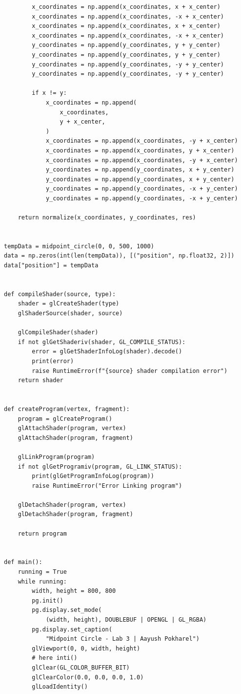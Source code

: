 \documentclass[12pt]{article}
\begin{document}
\begin{verbatim}
        x_coordinates = np.append(x_coordinates, x + x_center)
        x_coordinates = np.append(x_coordinates, -x + x_center)
        x_coordinates = np.append(x_coordinates, x + x_center)
        x_coordinates = np.append(x_coordinates, -x + x_center)
        y_coordinates = np.append(y_coordinates, y + y_center)
        y_coordinates = np.append(y_coordinates, y + y_center)
        y_coordinates = np.append(y_coordinates, -y + y_center)
        y_coordinates = np.append(y_coordinates, -y + y_center)

        if x != y:
            x_coordinates = np.append(
                x_coordinates,
                y + x_center,
            )
            x_coordinates = np.append(x_coordinates, -y + x_center)
            x_coordinates = np.append(x_coordinates, y + x_center)
            x_coordinates = np.append(x_coordinates, -y + x_center)
            y_coordinates = np.append(y_coordinates, x + y_center)
            y_coordinates = np.append(y_coordinates, x + y_center)
            y_coordinates = np.append(y_coordinates, -x + y_center)
            y_coordinates = np.append(y_coordinates, -x + y_center)

    return normalize(x_coordinates, y_coordinates, res)


tempData = midpoint_circle(0, 0, 500, 1000)
data = np.zeros(int(len(tempData)), [("position", np.float32, 2)])
data["position"] = tempData


def compileShader(source, type):
    shader = glCreateShader(type)
    glShaderSource(shader, source)

    glCompileShader(shader)
    if not glGetShaderiv(shader, GL_COMPILE_STATUS):
        error = glGetShaderInfoLog(shader).decode()
        print(error)
        raise RuntimeError(f"{source} shader compilation error")
    return shader


def createProgram(vertex, fragment):
    program = glCreateProgram()
    glAttachShader(program, vertex)
    glAttachShader(program, fragment)

    glLinkProgram(program)
    if not glGetProgramiv(program, GL_LINK_STATUS):
        print(glGetProgramInfoLog(program))
        raise RuntimeError("Error Linking program")

    glDetachShader(program, vertex)
    glDetachShader(program, fragment)

    return program


def main():
    running = True
    while running:
        width, height = 800, 800
        pg.init()
        pg.display.set_mode(
            (width, height), DOUBLEBUF | OPENGL | GL_RGBA)
        pg.display.set_caption(
            "Midpoint Circle - Lab 3 | Aayush Pokharel")
        glViewport(0, 0, width, height)
        # here inti()
        glClear(GL_COLOR_BUFFER_BIT)
        glClearColor(0.0, 0.0, 0.0, 1.0)
        glLoadIdentity()


\end{verbatim}
\end{document}
